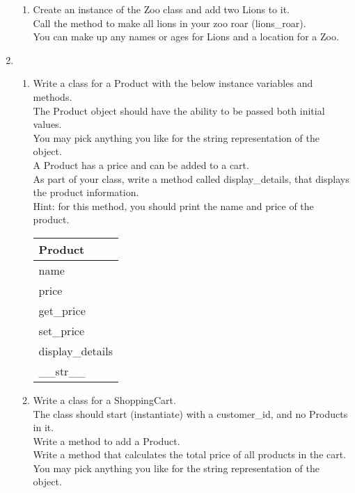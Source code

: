 \documentclass{article}
\begin{document}
\begin{enumerate}
\begin{enumerate}
		\item
			Create an instance of the Zoo class and add two Lions to it.\\
			Call the method to make all lions in your zoo roar (lions\_roar).\\
			You can make up any names or ages for Lions and a location for a Zoo.\\
	\end{enumerate}
\pagebreak


	\item
	\begin{enumerate}
		\item
			Write a class for a Product with the below instance variables and methods.\\ 
			The Product object should have the ability to be passed both initial values.\\  
			You may pick anything you like for the string representation of the object.\\
			A Product has a price and can be added to a cart.\\  
			As part of your class, write a method called display\_details, that displays the product information.\\
			Hint: for this method, you should print the name and price of the product.
			\begin{flushright}
			\begin{tabular}{|l|}
				\hline
				Product\\ \hline
				name\\	price\\	 \hline
				get\_price \\ set\_price \\ display\_details \\ \_\_str\_\_ \\ \hline
			\end{tabular}
			\end{flushright}

		\item
			Write a class for a ShoppingCart. \\
			The class should start (instantiate) with a customer\_id, and no Products in it. \\ 
			Write a method to add a Product.\\
			Write a method that calculates the total price of all products in the cart.\\
			You may pick anything you like for the string representation of the object.
	

\end{enumerate}
\end{enumerate}
\end{document}
